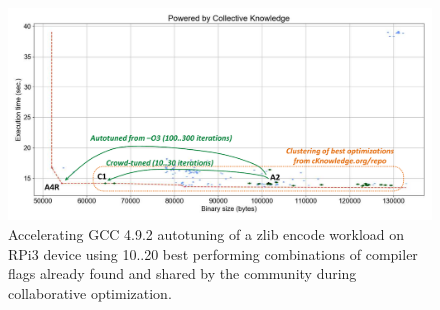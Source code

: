 

   \begin{figure}[!htbp]
     \centering
      \includegraphics[width=5.8in]
      {ck-assets/8d7b4b7a7b8545e7-cropped.pdf} %
      \vspace{0.1in}
      \vspace{0.1in}
     \caption{
      Accelerating GCC 4.9.2 autotuning of a zlib encode workload on RPi3 device using 
      10..20 best performing combinations of compiler flags already found 
      and shared by the community during collaborative optimization.
     }
     \label{fig:autotuning-zlib-encode-gcc4-reactions}
   \end{figure}

